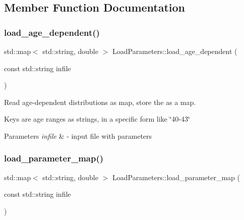\subsection{Member Function Documentation}
\mbox{\label{classLoadParameters_a682b13d074ff70340bbc782d31ccd10b}} 
\subsubsection{\texorpdfstring{load\+\_\+age\+\_\+dependent()}{load\_age\_dependent()}}
{\footnotesize\ttfamily std\+::map$<$ std\+::string, double $>$ Load\+Parameters\+::load\+\_\+age\+\_\+dependent (\begin{DoxyParamCaption}\item[{const std\+::string}]{infile }\end{DoxyParamCaption})}



Read age-\/dependent distributions as map, store the as a map. 

Keys are age ranges as strings, in a specific form like \char`\"{}40-\/43\char`\"{}


\begin{DoxyParams}{Parameters}
{\em infile} & -\/ input file with parameters \\
\hline
\end{DoxyParams}
\mbox{\label{classLoadParameters_a1cdde96a8ca3874ef93e1c1a8970a06a}} 
\subsubsection{\texorpdfstring{load\+\_\+parameter\+\_\+map()}{load\_parameter\_map()}}
{\footnotesize\ttfamily std\+::map$<$ std\+::string, double $>$ Load\+Parameters\+::load\+\_\+parameter\+\_\+map (\begin{DoxyParamCaption}\item[{const std\+::string}]{infile }\end{DoxyParamCaption})}



